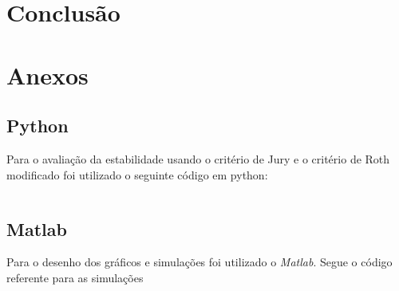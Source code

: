 \documentclass[a4paper,11pt]{article}
\begin{document}
\subsection{}

\section{Conclusão}


\nocite{sympy}



\newpage
\section{Anexos}
\subsection{Python}

Para o avaliação da estabilidade usando o critério de Jury e o critério de Roth modificado foi utilizado o seguinte código em python:

\inputminted[xleftmargin=15pt,linenos,frame=single,framesep=5pt]{python}{../python/exsim2.py}

\newpage
\subsection{Matlab}

Para o desenho dos gráficos e simulações foi utilizado o \textit{Matlab}. Segue o código referente para as simulações

\inputminted[xleftmargin=15pt,linenos,frame=single,framesep=5pt]{matlab}{../matlab/exsim2/exsim2.m}


\end{document}

